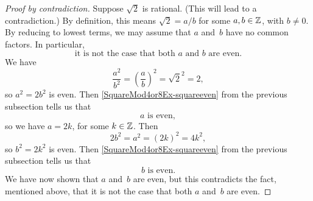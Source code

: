\documentclass[../MATH-2000-Notes.tex]{subfiles}
\begin{document}
\begin{proof}[Proof by contradiction]
    Suppose $\sqrt{2}$ is rational. (This will lead to a contradiction.) By definition, this means $\sqrt{2} = a/b$ for some $a,b \in \mathbb{Z}$, with $b \neq 0$. By reducing to lowest terms, we may assume that $a$ and~$b$ have no common factors. In particular, 
    $$ \text{it is not the case that both $a$ and~$b$ are even.}$$
    We have 
        $$ \frac{a^2}{b^2} = \left(\frac{a}{b}\right)^2 = \sqrt{2}^2 = 2 ,$$
    so $a^2 = 2b^2$ is even. Then \ref{SquareMod4or8Ex-squareeven} from the previous subsection tells us that 
        $$ \text{$a$~is even}, $$
    so we have $a = 2k$, for some $k \in \mathbb{Z}$. Then
        $$2b^2 = a^2 = (2k)^2 = 4k^2 ,$$
    so $b^2 = 2k^2$ is even. Then \ref{SquareMod4or8Ex-squareeven} from the previous subsection tells us that 
        $$ \text{$b$~is even}. $$
    We have now shown that $a$ and~$b$ are even, but this contradicts the fact, mentioned above, that it is not the case that both $a$ and~$b$ are even.
\end{proof}
\end{document}
